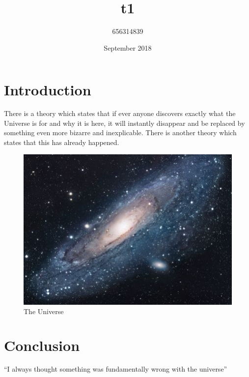 \documentclass{article}
\title{t1}
\author{656314839 }
\date{September 2018}
\begin{document}
\maketitle

\section{Introduction}
There is a theory which states that if ever anyone discovers exactly what the Universe is for and why it is here, it will instantly disappear and be replaced by something even more bizarre and inexplicable.
There is another theory which states that this has already happened.

\begin{figure}[h!]
\centering
\includegraphics[scale=1.7]{universe}
\caption{The Universe}
\label{fig:universe}
\end{figure}

\section{Conclusion}
``I always thought something was fundamentally wrong with the universe'' \citep{adams1995hitchhiker}



\end{document}
